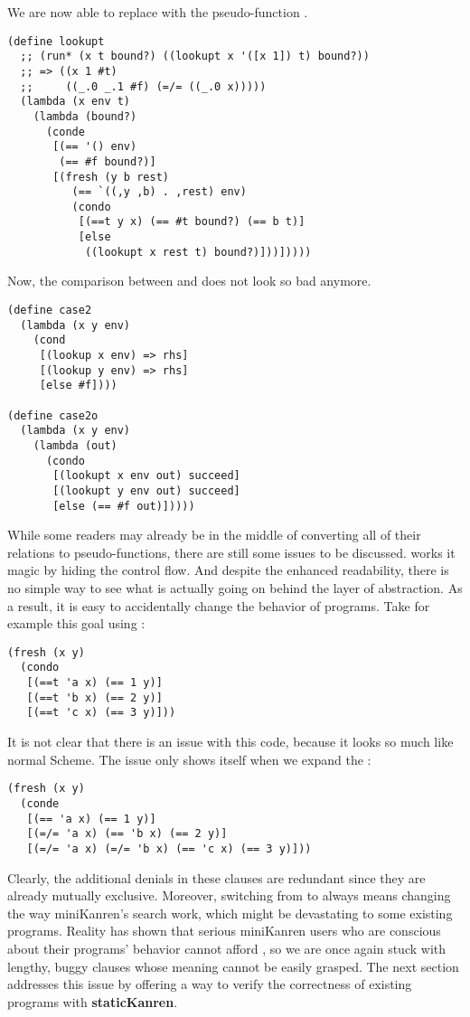 We are now able to replace  with the pseudo-function .
\begin{lstlisting}
(define lookupt
  ;; (run* (x t bound?) ((lookupt x '([x 1]) t) bound?))
  ;; => ((x 1 #t)
  ;;     ((_.0 _.1 #f) (=/= ((_.0 x)))))
  (lambda (x env t)
    (lambda (bound?)
      (conde
       [(== '() env)
        (== #f bound?)]
       [(fresh (y b rest)
          (== `((,y ,b) . ,rest) env)
          (condo
           [(==t y x) (== #t bound?) (== b t)]
           [else
            ((lookupt x rest t) bound?)]))]))))
\end{lstlisting}
Now, the comparison between  and  does not look so bad anymore.
\begin{lstlisting}
(define case2
  (lambda (x y env)
    (cond
     [(lookup x env) => rhs]
     [(lookup y env) => rhs]
     [else #f])))

(define case2o
  (lambda (x y env)
    (lambda (out)
      (condo
       [(lookupt x env out) succeed]
       [(lookupt y env out) succeed]
       [else (== #f out)]))))
\end{lstlisting}

While some readers may already be in the middle of converting all of their relations to pseudo-functions, there are still some issues to be discussed.  works it magic by hiding the control flow. And despite the enhanced readability, there is no simple way to see what is actually going on behind the layer of abstraction. As a result, it is easy to accidentally change the behavior of programs. Take for example this goal using :
\begin{lstlisting}
(fresh (x y)
  (condo
   [(==t 'a x) (== 1 y)]
   [(==t 'b x) (== 2 y)]
   [(==t 'c x) (== 3 y)]))
\end{lstlisting}
It is not clear that there is an issue with this code, because it looks so much like normal Scheme. The issue only shows itself when we expand the :
\begin{lstlisting}
(fresh (x y)
  (conde
   [(== 'a x) (== 1 y)]
   [(=/= 'a x) (== 'b x) (== 2 y)]
   [(=/= 'a x) (=/= 'b x) (== 'c x) (== 3 y)]))
\end{lstlisting}
Clearly, the additional denials in these  clauses are redundant since they are already mutually exclusive. Moreover, switching from  to  always means changing the way miniKanren's search work, which might be devastating to some existing programs. Reality has shown that serious miniKanren users who are conscious about their programs' behavior cannot afford , so we are once again stuck with lengthy, buggy  clauses whose meaning cannot be easily grasped. The next section addresses this issue by offering a way to verify the correctness of existing programs with \textbf{staticKanren}.